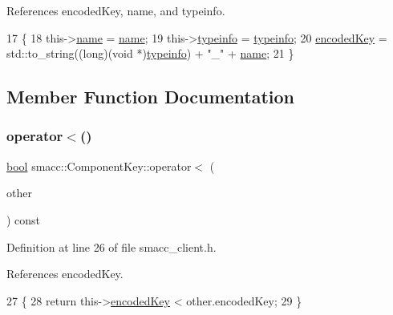 References encoded\+Key, name, and typeinfo.


\begin{DoxyCode}
17     \{
18         this->\hyperlink{structsmacc_1_1ComponentKey_ad38f21bde4dad1dd3c143bdc42e6f30d}{name} = \hyperlink{structsmacc_1_1ComponentKey_ad38f21bde4dad1dd3c143bdc42e6f30d}{name};
19         this->\hyperlink{structsmacc_1_1ComponentKey_a148bab7ba01039d4bcabfd93529b333a}{typeinfo} = \hyperlink{structsmacc_1_1ComponentKey_a148bab7ba01039d4bcabfd93529b333a}{typeinfo};
20         \hyperlink{structsmacc_1_1ComponentKey_a4f588034d085ba425808d98c36f8a095}{encodedKey} = std::to\_string((\textcolor{keywordtype}{long})(\textcolor{keywordtype}{void} *)\hyperlink{structsmacc_1_1ComponentKey_a148bab7ba01039d4bcabfd93529b333a}{typeinfo}) + \textcolor{stringliteral}{"\_"} + 
      \hyperlink{structsmacc_1_1ComponentKey_ad38f21bde4dad1dd3c143bdc42e6f30d}{name};
21     \}
\end{DoxyCode}


\subsection{Member Function Documentation}
\mbox{\label{structsmacc_1_1ComponentKey_a3e38f2057ef1d25e518a52a0d2165b75}} 
\subsubsection{\texorpdfstring{operator$<$()}{operator<()}}
{\footnotesize\ttfamily \hyperlink{classbool}{bool} smacc\+::\+Component\+Key\+::operator$<$ (\begin{DoxyParamCaption}\item[{const \hyperlink{structsmacc_1_1ComponentKey}{Component\+Key} \&}]{other }\end{DoxyParamCaption}) const\hspace{0.3cm}{\ttfamily [inline]}}



Definition at line 26 of file smacc\+\_\+client.\+h.



References encoded\+Key.


\begin{DoxyCode}
27     \{
28         \textcolor{keywordflow}{return} this->\hyperlink{structsmacc_1_1ComponentKey_a4f588034d085ba425808d98c36f8a095}{encodedKey} < other.encodedKey;
29     \}
\end{DoxyCode}
\mbox{\label{structsmacc_1_1ComponentKey_a6d5bfba42edb0463512b27e273cfe47e}} 
